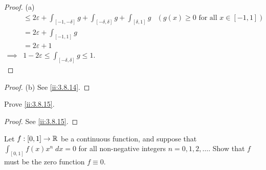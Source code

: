 \begin{proof}{(a)}
\begin{align*}
             & \leq 2 \varepsilon + \int_{[-1, -\delta]} g + \int_{[-\delta, \delta]} g + \int_{[\delta, 1]} g & (g(x) \geq 0 \text{ for all } x \in [-1, 1]) \\
             & = 2 \varepsilon + \int_{[-1, 1]} g                                                                                                             \\
             & = 2 \varepsilon + 1                                                                                                                            \\
    \implies & 1 - 2 \varepsilon \leq \int_{[-\delta, \delta]} g \leq 1.
  \end{align*}
\end{proof}

\begin{proof}{(b)}
  See \cref{ii:3.8.14}.
\end{proof}

\begin{ex}\label{ii:ex:3.8.7}
  Prove \cref{ii:3.8.15}.
\end{ex}

\begin{proof}
  See \cref{ii:3.8.15}.
\end{proof}

\begin{ex}\label{ii:ex:3.8.8}
  Let \(f : [0, 1] \to \mathbb{R}\) be a continuous function, and suppose that \(\int_{[0, 1]} f(x) x^n \; dx = 0\) for all non-negative integers \(n = 0, 1, 2, \dots\).
  Show that \(f\) must be the zero function \(f \equiv 0\).
\end{ex}

